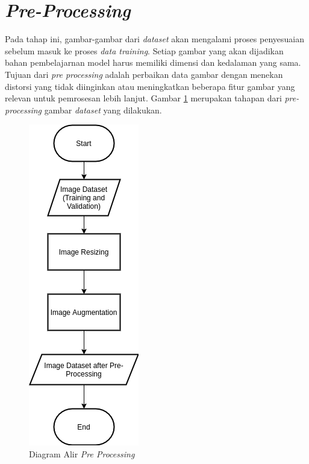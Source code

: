 \section{\textit{Pre-Processing}}
\label{sec:preprocessing}

Pada tahap ini, gambar-gambar dari \textit{dataset} akan mengalami proses penyesuaian sebelum masuk ke proses \textit{data training}. Setiap gambar yang akan dijadikan bahan pembelajarnan model harus memiliki dimensi dan kedalaman yang sama. Tujuan dari \textit{pre processing} adalah perbaikan data gambar dengan menekan distorsi yang tidak diinginkan atau meningkatkan beberapa fitur gambar yang relevan untuk pemrosesan lebih lanjut. Gambar \ref{fig:preprocessing} merupakan tahapan dari \textit{pre-processing} gambar \textit{dataset} yang dilakukan.

\begin{figure}[ht]
	\centering
	\includegraphics[scale=0.5]{gambar/flowchart-preprocessing.png}
	\caption{Diagram Alir \textit{Pre Processing}}
	\label{fig:preprocessing}
\end{figure}

